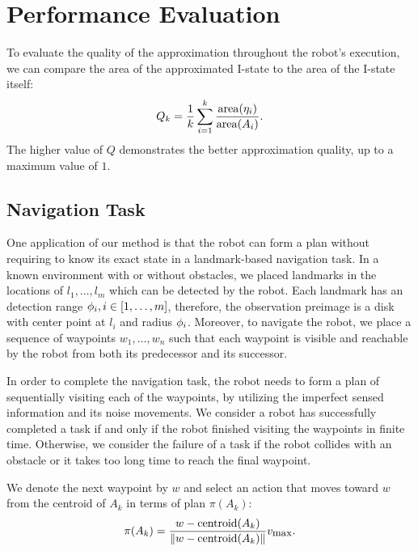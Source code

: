 \section{Performance Evaluation}
\label{sec:simu-cga}
To evaluate the quality of the approximation throughout the robot's execution,
we can compare the area of the approximated I-state to the area of the
I-state itself:
\begin{equation}
  \label{eq:error}
  Q_k = \frac{1}{k} \sum_{i=1}^k \frac{\operatorname{area}(\eta_i)}{\operatorname{area}(A_i)}.
\end{equation}
The higher value of $Q$ demonstrates the better approximation quality, up to
a maximum value of $1$. 


\subsection{Navigation Task}
\label{subsec:nav}
One application of our method is that the robot can form a plan without
requiring to know its exact state in a landmark-based navigation task.  
%
In a known environment with or without obstacles, we placed landmarks in the
locations of $l_1,\ldots,l_m$ which can be detected by the robot. 
%
Each landmark has an detection range $\phi_i, i \in [1, \ldots, m]$, therefore, the observation
preimage is a disk with center point at $l_i$ and radius $\phi_i$. 
%
Moreover, to navigate the robot, we place a sequence of waypoints $w_1,\ldots,w_n$
such that each waypoint is visible and reachable 
by the robot from both its predecessor and its successor.

In order to complete the navigation task, the robot needs to form a plan of
sequentially visiting each of the waypoints, by utilizing the imperfect sensed
information and its noise movements. 
%
We consider a robot has successfully completed a task if and only if the robot finished visiting the waypoints in finite time. 
%
Otherwise, we consider the failure of a task if the robot collides with
an obstacle or it takes too long time to reach the final waypoint.

We denote the next waypoint by $w$ and select an action that moves toward $w$
from the centroid of $A_k$ in terms of plan $\pi(A_k)$:
\begin{equation}
  \label{eq:vhat}
  \pi(A_k) = \dfrac{w - \operatorname{centroid}(A_k)}{\|w- \operatorname{centroid}(A_k)\|} v_{\mbox{\small max}}.
\end{equation}


